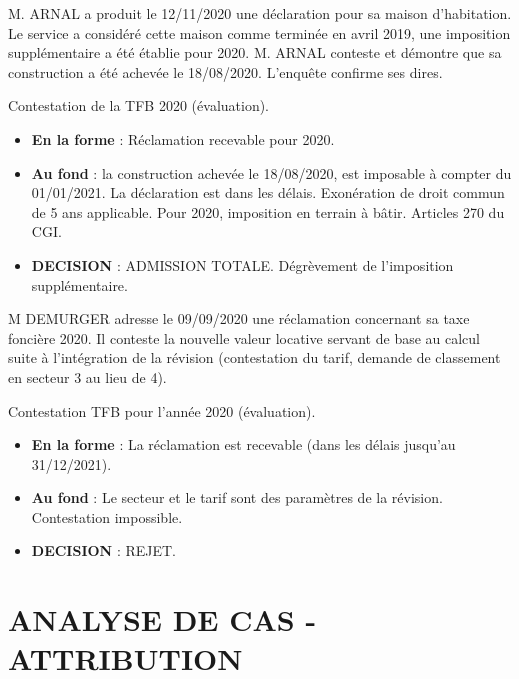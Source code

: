 \documentclass[answers, 12pt]{exam}
\begin{document}
\begin{questions}
		\question M. ARNAL a produit le 12/11/2020 une déclaration pour sa maison d'habitation. Le service a considéré cette maison comme terminée en avril 2019, une imposition supplémentaire a été établie pour 2020. M. ARNAL conteste et démontre que sa construction a été achevée le 18/08/2020. L'enquête confirme ses dires.
		\begin{solution}
			Contestation de la TFB 2020 (évaluation).
			\begin{itemize}
				\item \textbf{En la forme} : Réclamation recevable pour 2020.
				\item \textbf{Au fond} : la construction achevée le 18/08/2020, est imposable à compter du 01/01/2021. La déclaration est dans les délais. Exonération de droit commun de 5 ans applicable. Pour 2020, imposition en terrain à bâtir. Articles 270 du CGI.
				\item \textbf{DECISION} : ADMISSION TOTALE. Dégrèvement de l'imposition supplémentaire.
			\end{itemize}
		\end{solution}
		
		\question M DEMURGER adresse le 09/09/2020 une réclamation concernant sa taxe foncière 2020. Il conteste la nouvelle valeur locative servant de base au calcul suite à l'intégration de la révision (contestation du tarif, demande de classement en secteur 3 au lieu de 4).
		\begin{solution}
			Contestation TFB pour l'année 2020 (évaluation).
			\begin{itemize}
				\item \textbf{En la forme} : La réclamation est recevable (dans les délais jusqu'au 31/12/2021).
				\item \textbf{Au fond} : Le secteur et le tarif sont des paramètres de la révision. Contestation impossible.
				\item \textbf{DECISION} : REJET.
			\end{itemize}
		\end{solution}
		
	\end{questions}
	
	
	
	\section*{ANALYSE DE CAS  - ATTRIBUTION}
	
\end{document}
